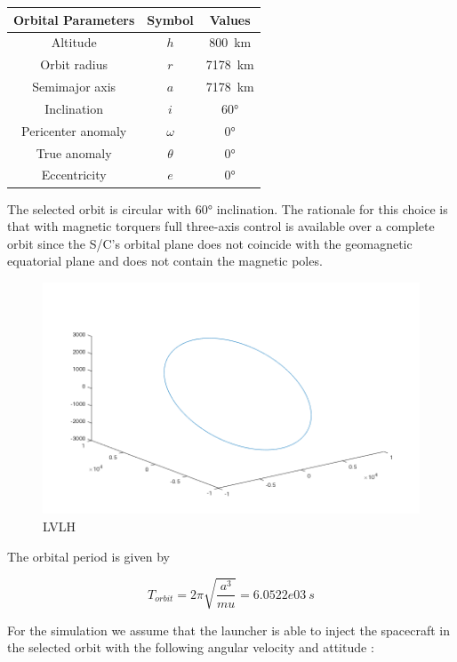 \documentclass[11pt,a4paper]{report}
\begin{document}
\begin{table}[H]
	\centering
	\begin{tabular}{|c|c|c|}
		\hline
		Orbital Parameters & Symbol & Values \\
		\hline
		Altitude & $h$ & \SI{800}{\km} \\ 
		\hline
		Orbit radius & $r$ & \SI{7178}{\km}\\
		\hline
		Semimajor axis & $a$ & \SI{7178}{\km}\\
		\hline
		Inclination & $i$ & \ang{60}\\
		\hline
		Pericenter anomaly & $\omega$ & \ang{0}\\
		\hline
		True anomaly & $\theta$ &  \ang{0}\\
		\hline
		Eccentricity & $e$ &  \ang{0}\\
		\hline
	\end{tabular}
\end{table}

The selected orbit is circular with \ang{60} inclination.
The rationale for this choice is that with magnetic torquers full three-axis control is available over a complete orbit since the S/C's orbital plane does not coincide with the geomagnetic equatorial plane and does not contain the magnetic poles. 

\begin{figure}[H]
 \centering
 \includegraphics[scale=0.4]{gfx/results/lvlh_orbit.png}
 \caption{LVLH} 
 \label{fig:lvlhorbit}
\end{figure}

The orbital period is given by 

$$T_{orbit} = 2\pi\sqrt{\frac{a^{3}}{mu}} = 6.0522e03 \ s$$

For the simulation we assume that the launcher is able to inject the spacecraft in the selected orbit with the following angular velocity and attitude : 
\end{document}
